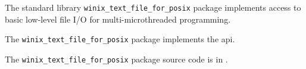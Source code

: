 
The standard library {\tt winix\_text\_file\_for\_posix} package implements access to basic low-level 
file I/O for multi-microthreaded programming.

The {\tt winix\_text\_file\_for\_posix} package implements the  api.

The {\tt winix\_text\_file\_for\_posix} package source code is in .

